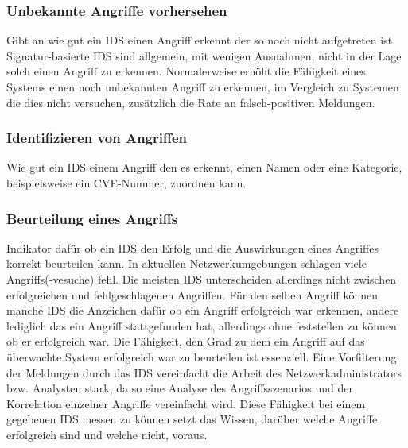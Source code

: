 \subsubsection{Unbekannte Angriffe vorhersehen}
Gibt an wie gut ein IDS einen Angriff erkennt der so noch nicht aufgetreten ist. Signatur-basierte IDS sind allgemein, mit wenigen Ausnahmen, nicht in der Lage solch einen Angriff zu erkennen. Normalerweise erhöht die Fähigkeit eines Systems einen noch unbekannten Angriff zu erkennen, im Vergleich zu Systemen die dies nicht versuchen, zusätzlich die Rate an falsch-positiven Meldungen.
\subsubsection{Identifizieren von Angriffen}
Wie gut ein IDS einem Angriff den es erkennt, einen Namen oder eine Kategorie, beispielsweise ein CVE-Nummer, zuordnen kann.
\subsubsection{Beurteilung  eines Angriffs}
Indikator dafür ob ein IDS den Erfolg und die Auswirkungen eines Angriffes korrekt beurteilen kann. In aktuellen Netzwerkumgebungen schlagen viele Angriffs(-vesuche) fehl. Die meisten IDS unterscheiden allerdings nicht zwischen erfolgreichen und fehlgeschlagenen Angriffen. Für den selben Angriff können manche IDS die Anzeichen dafür ob ein Angriff erfolgreich war erkennen, andere lediglich das ein Angriff stattgefunden hat, allerdings ohne feststellen zu können ob er erfolgreich war. Die Fähigkeit, den Grad zu dem ein Angriff auf das überwachte System erfolgreich war zu beurteilen ist essenziell. Eine Vorfilterung der Meldungen durch das IDS vereinfacht die Arbeit des Netzwerkadministrators bzw. Analysten stark, da so eine Analyse des Angriffsszenarios und der Korrelation einzelner Angriffe vereinfacht wird. Diese Fähigkeit bei einem gegebenen IDS messen zu können setzt das Wissen, darüber welche Angriffe erfolgreich sind und welche nicht, voraus.

